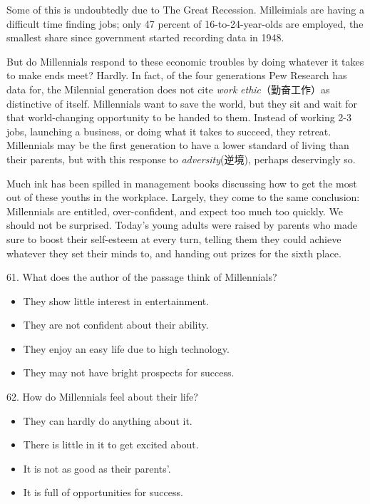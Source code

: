 \documentclass[UTF8,11pt]{ctexart}
\begin{document}
Some of this is undoubtedly due to The Great Recession. Milleimials are having a difficult time finding jobs; only 47 percent of 16-to-24-year-olds are employed, the smallest share since government started recording data in 1948.


But do Millennials respond to these economic troubles by doing whatever it takes to make ends meet? Hardly. In fact, of the four generations Pew Research has data for, the Milennial generation does not cite\textit{ work} \textit{ethic}（勤奋工作）as distinctive of itself. Millennials want to save the world, but they sit and wait for that world-changing opportunity to be handed to them. Instead of working 2-3 jobs, launching a business, or doing what it takes to succeed, they retreat. Millennials may be the first generation to have a lower standard of living than their parents, but with this response to\textit{ adversity}(逆境), perhaps deservingly so.


Much ink has been spilled in management books discussing how to get the most out of these youths in the workplace. Largely, they come to the same conclusion: Millennials are entitled, over-confident, and expect too much too quickly. We should not be surprised. Today’s young adults were raised by parents who made sure to boost their self-esteem at every turn, telling them they could achieve whatever they set their minds to, and handing out prizes for the sixth place.


61. What does the author of the passage think of Millennials?


\begin{itemize}[leftmargin=2em,itemsep=.2em,topsep=.4em]\item[A.] They show little interest in entertainment.
\item[B.] They are not confident about their ability.
\item[C.] They enjoy an easy life due to high technology.
\item[D.] They may not have bright prospects for success.
\end{itemize}

62. How do Millennials feel about their life?


\begin{itemize}[leftmargin=2em,itemsep=.2em,topsep=.4em]\item[A.] They can hardly do anything about it.
\item[B.] There is little in it to get excited about.
\item[C.] It is not as good as their parents’.
\item[D.] It is full of opportunities for success.
\end{itemize}
\end{document}
